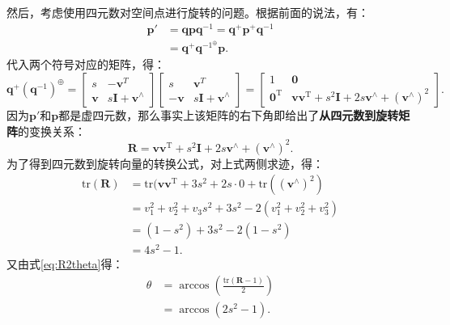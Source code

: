 然后，考虑使用四元数对空间点进行旋转的问题。根据前面的说法，有：
\begin{equation}
\begin{split}
\bm{p}' &= \bm{q} \bm{p} \bm{q}^{-1} = \bm{q}^+ \bm{p}^+ \bm{q}^{-1} \\
&= \bm{q}^+ \bm{q}^{{-1}^{\oplus}} \bm{p}.
\end{split}
\end{equation}
代入两个符号对应的矩阵，得：
\begin{equation}\label{eq:quaternion-to-rotation-matrix-derive}
{\bm{q}^ + }{\left( {{\bm{q}^{ - 1}}} \right)^ \oplus } = \left[ \begin{array}{*{20}{c}}
	s&-\bm{v}^T\\
	\bm{v}&s\bm{I}+\bm{v}^\wedge 
	\end{array} \right]\left[\begin{array}{*{20}{c}}
	s&{\bm{v} ^T}\\
	{ - \bm{v} }&{s\bm{I} + \bm{v} ^ \wedge }
	\end{array} \right] = \left[ \begin{array}{*{20}{c}}
	1&\bm{0} \\
	\bm{0}^\mathrm{T}&\bm{v}\bm{v}^\mathrm{T} + {s^2} \bm{I} + 2s\bm{v} ^ \wedge + {(\bm{v} ^ \wedge)}^2 
	\end{array} \right].
\end{equation}
因为$\bm{p}'$和$\bm{p}$都是虚四元数，那么事实上该矩阵的右下角即给出了\textbf{从四元数到旋转矩阵}的变换关系：
\begin{equation}
\bm{R} = \bm{v} \bm{v}^\mathrm{T} + {s^2} \bm{I} + 2s\bm{v} ^ \wedge + {(\bm{v} ^ \wedge)}^2.
\end{equation}
为了得到四元数到旋转向量的转换公式，对上式两侧求迹，得：
\begin{equation}
\begin{aligned}
\mathrm{tr}(\bm{R}) &= \mathrm{tr}(\bm{v}\bm{v}^\mathrm{T} + 3s^2 + 2s \cdot 0 + \mathrm{tr}((\bm{v}^\wedge)^2) \\
&= v_1^2+v_2^2+v_3s^2 + 3s^2 - 2(v_1^2+v_2^2+v_3^2) \\
&= (1-s^2) + 3s^2 -2(1-s^2)\\
&= 4s^2 -1.
\end{aligned}
\end{equation}
又由式\eqref{eq:R2theta}得：
\begin{equation}
\begin{aligned}
\theta &= \arccos(\frac{\mathrm{tr}(\bm{R}-1)}{2}) \\
&=\arccos(2s^2-1).
\end{aligned}
\end{equation}
